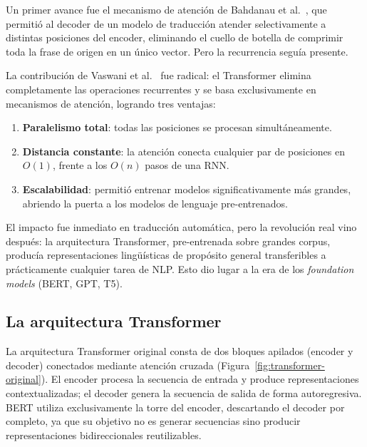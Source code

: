 Un primer avance fue el mecanismo de atención de Bahdanau et al.\
\cite{bahdanau2015neural}, que permitió al decoder de un modelo de traducción atender
selectivamente a distintas posiciones del encoder, eliminando el cuello de botella de
comprimir toda la frase de origen en un único vector. Pero la recurrencia seguía
presente.

La contribución de Vaswani et al.\ \cite{vaswani2017attention} fue radical: el
Transformer elimina completamente las operaciones recurrentes y se basa
exclusivamente en mecanismos de atención, logrando tres ventajas:

\begin{enumerate}[nosep]
    \item \textbf{Paralelismo total}: todas las posiciones se procesan simultáneamente.
    \item \textbf{Distancia constante}: la atención conecta cualquier par de posiciones
    en $O(1)$, frente a los $O(n)$ pasos de una RNN.
    \item \textbf{Escalabilidad}: permitió entrenar modelos significativamente más
    grandes, abriendo la puerta a los modelos de lenguaje pre-entrenados.
\end{enumerate}

El impacto fue inmediato en traducción automática, pero la revolución real vino
después: la arquitectura Transformer, pre-entrenada sobre grandes corpus, producía
representaciones lingüísticas de propósito general transferibles a prácticamente
cualquier tarea de NLP. Esto dio lugar a la era de los \textit{foundation models}
(BERT, GPT, T5).

\subsection{La arquitectura Transformer}
\label{sec:sota-transformer}

La arquitectura Transformer original \cite{vaswani2017attention} consta de dos
bloques apilados (encoder y decoder) conectados mediante atención cruzada
(Figura~\ref{fig:transformer-original}). El encoder procesa la secuencia de
entrada y produce representaciones contextualizadas; el decoder genera la secuencia
de salida de forma autoregresiva. BERT utiliza exclusivamente la torre del encoder,
descartando el decoder por completo, ya que su objetivo no es generar secuencias
sino producir representaciones bidireccionales reutilizables.

